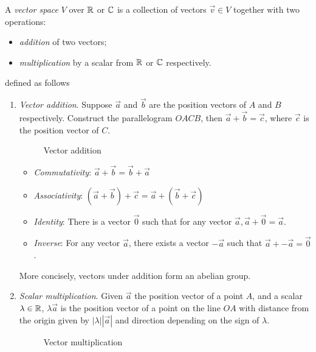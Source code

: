 \documentclass{../../template/note}
\begin{document}
    \begin{definition}
        A \emph{vector space} \(V\) over \(\mathbb R\) or \(\mathbb C\) is a collection of vectors \(\vec v \in V\) together with two operations:
        \begin{itemize}
            \item \emph{addition} of two vectors;
            \item \emph{multiplication} by a scalar from \(\mathbb R\) or \(\mathbb C\) respectively.
        \end{itemize}
        defined as follows
        \begin{enumerate}[label=\protect\circled{\arabic*}]
            \item \emph{Vector addition}. Suppose \(\vec a\) and \(\vec b\) are the position vectors of \(A\) and \(B\) respectively. Construct the parallelogram \(OACB\), then \(\vec a + \vec b = \vec c\), where \(\vec c\) is the position vector of \(C\).
            \begin{figure}[ht]
                \centering
                \caption{Vector addition}
                \label{fig:vector-addition}
            \end{figure}
            \begin{itemize}
                \item \emph{Commutativity}: \(\vec a + \vec b = \vec b + \vec a\)
                \item \emph{Associativity}: \((\vec a + \vec b) + \vec c = \vec a + (\vec b + \vec c)\)
                \item \emph{Identity}: There is a vector \(\vec 0\) such that for any vector \(\vec a, \vec a + \vec 0 = \vec a\).
                \item \emph{Inverse}: For any vector \(\vec a\), there exists a vector \(-\vec a\) such that \(\vec a + -\vec a = \vec 0\).
            \end{itemize}
            More concisely, vectors under addition form an abelian group.

            \item \emph{Scalar multiplication}. Given \(\vec a\) the position vector of a point \(A\), and a scalar \(\lambda \in \mathbb R\), \(\lambda \vec a\) is the position vector of a point on the line \(OA\) with distance from the origin given by \(|\lambda||\vec a|\) and direction depending on the sign of \(\lambda\).
            
            \begin{figure}[ht]
                \centering
                \caption{Vector multiplication}
                \label{fig:vector-multiplication}
            \end{figure}
            

\end{enumerate}
\end{definition}
\end{document}

